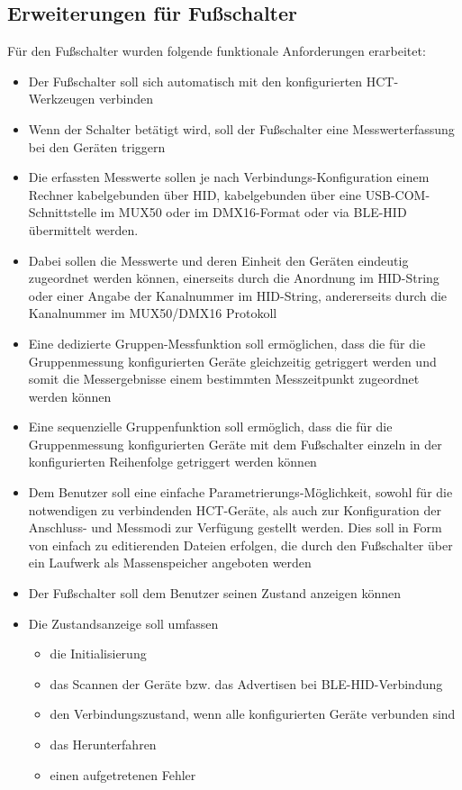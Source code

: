 \subsection{Erweiterungen für Fußschalter}
Für den Fußschalter wurden folgende funktionale Anforderungen erarbeitet:
\begin{itemize}
	\item Der Fußschalter soll sich automatisch mit den konfigurierten \ac{HCT}-Werkzeugen verbinden 
	\item Wenn der Schalter betätigt wird, soll der Fußschalter eine Messwerterfassung bei den Geräten triggern
	\item Die erfassten Messwerte sollen je nach Verbindungs-Konfiguration einem Rechner kabelgebunden über HID, kabelgebunden über eine USB-COM-Schnittstelle im MUX50 oder im DMX16-Format oder via BLE-HID übermittelt werden.  
	\item Dabei sollen die Messwerte und deren Einheit den Geräten eindeutig zugeordnet werden können, einerseits durch die Anordnung im HID-String oder einer Angabe der Kanalnummer im HID-String, andererseits durch die Kanalnummer im MUX50/DMX16 Protokoll 
	\item Eine dedizierte Gruppen-Messfunktion soll ermöglichen, dass die für die Gruppenmessung konfigurierten Geräte gleichzeitig getriggert werden und somit die Messergebnisse einem bestimmten Messzeitpunkt zugeordnet werden können
	\item Eine sequenzielle Gruppenfunktion soll ermöglich, dass die für die Gruppenmessung konfigurierten Geräte mit dem Fußschalter einzeln in der konfigurierten Reihenfolge getriggert werden können
	\item Dem Benutzer soll eine einfache Parametrierungs-Möglichkeit, sowohl für die notwendigen zu verbindenden HCT-Geräte, als auch zur Konfiguration der Anschluss- und Messmodi zur Verfügung gestellt werden. Dies soll in Form von einfach zu editierenden Dateien erfolgen, die durch den Fußschalter über ein Laufwerk als Massenspeicher angeboten werden
	\item Der Fußschalter soll dem Benutzer seinen Zustand anzeigen können
	\item Die Zustandsanzeige soll umfassen
	\begin{itemize}
		\item die Initialisierung
		\item das Scannen der Geräte bzw. das Advertisen bei BLE-HID-Verbindung
		\item den Verbindungszustand, wenn alle konfigurierten Geräte verbunden sind 
		\item das Herunterfahren
		\item einen aufgetretenen Fehler
	\end{itemize}
\end{itemize}

